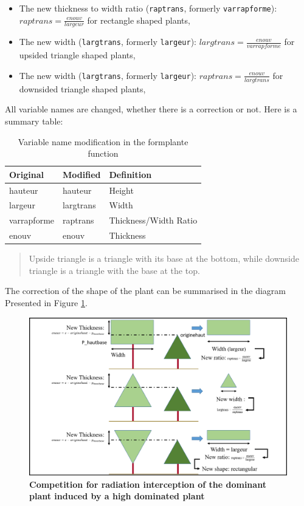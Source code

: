 \documentclass[]{book}
\providecommand{\tightlist}{%
  \setlength{\itemsep}{0pt}\setlength{\parskip}{0pt}}
\begin{document}
\begin{itemize}
\tightlist
\item
  The new thickness to width ratio (\texttt{raptrans}, formerly \texttt{varrapforme}): \(raptrans=\frac{enouv}{largeur}\) for rectangle shaped plants,
\item
  The new width (\texttt{largtrans}, formerly \texttt{largeur}): \(largtrans=\frac{enouv}{varrapforme}\) for upsided triangle shaped plants,
\item
  The new width (\texttt{largtrans}, formerly \texttt{largeur}): \(raptrans=\frac{enouv}{largtrans}\) for downsided triangle shaped plants,
\end{itemize}

All variable names are changed, whether there is a correction or not. Here is a summary table:

\begin{table}[t]

\caption{\label{tab:varmatch}Variable name modification in the formplante function}
\centering
\begin{tabular}{l|l|l}
\hline
Original & Modified & Definition\\
\hline
hauteur & hauteur & Height\\
\hline
largeur & largtrans & Width\\
\hline
varrapforme & raptrans & Thickness/Width Ratio\\
\hline
enouv & enouv & Thickness\\
\hline
\end{tabular}
\end{table}

\begin{quote}
Upside triangle is a triangle with its base at the bottom, while downside triangle is a triangle with the base at the top.
\end{quote}

The correction of the shape of the plant can be summarised in the diagram Presented in Figure \ref{fig:Comprad}.

\begin{figure}
\centering
\includegraphics{img/Light-interception-dominant-2.png}
\caption{\label{fig:Comprad}\textbf{Competition for radiation interception of the dominant plant induced by a high dominated plant}}
\end{figure}
\end{document}
